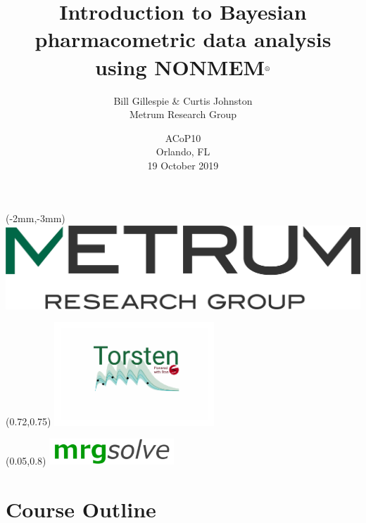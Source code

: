 \documentclass{beamer}
\title[Bayesian data analysis using NONMEM$^\text{\textregistered}$]{Introduction to
  Bayesian pharmacometric data analysis using NONMEM$^\text{\textregistered}$}
\author{Bill Gillespie \& Curtis Johnston\\
Metrum Research Group}
\date[19 October 2019]{ACoP10  \\
Orlando, FL \\
19 October 2019}
\begin{document}
 
\begin{frame}

\begin{textblock*}{80mm}(-2mm,-3mm)
\includegraphics[scale=0.2]{graphics/metrum_new_logo.png}
\end{textblock*}


\begin{textblock*}{80mm}(0.72\textwidth,0.75\textheight)
\includegraphics[trim=0.9in 0.9in 0.9in 0.9in,clip,width=0.45\textwidth]{graphics/torsten-white-Stan.png}
\end{textblock*}

\begin{textblock*}{80mm}(0.05\textwidth,0.8\textheight)
\includegraphics[width=0.35\textwidth]{graphics/mrgsolve-300x63.png}
\end{textblock*}

\titlepage

\nocite{gelman2014,mcelreath2018statistical,robert2007,carlin2008,berger1993,3565,spiegelhalter2004,robertAndCasella2010,robertAndCasella2004}

\nocite{2875,3012,2911,3208,2720,3537,2074,2071,3293,3345}

\end{frame}

\section{Course Outline}
\end{document}
